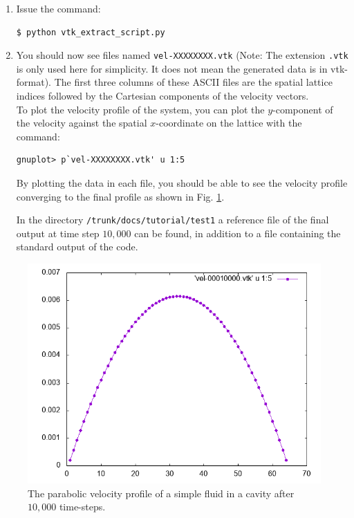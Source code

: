 \documentclass[11pt,twoside,a4paper]{article}
\begin{document}
\begin{enumerate}
\begin{enumerate}
to be processed.
\item \texttt{vel=1} for velocity post-processing, 
\item The other flags should be set to zero, e.g. \texttt{phi=0}. 
\end{enumerate}
\item Issue the command:
\begin{lstlisting}
$ python vtk_extract_script.py
\end{lstlisting}
\item You should now see files named \texttt{vel-XXXXXXXX.vtk} (Note: The extension \texttt{.vtk} is only used here for simplicity.
It does not mean the generated data is in vtk-format). 
The first three columns of these ASCII files are the spatial lattice indices followed by the Cartesian components of the velocity vectors.\\

To plot the velocity profile of the system, you can plot the $y$-component of the velocity against 
the spatial $x$-coordinate on the lattice with the command:
\begin{lstlisting}
gnuplot> p`vel-XXXXXXXX.vtk' u 1:5
\end{lstlisting} 
By plotting the data in each file, you should be able to see the velocity profile converging to the final profile 
as shown in Fig. \ref{fig:velocityProfile}. 

In the directory \texttt{/trunk/docs/tutorial/test1} a reference file of the final 
output at time step $10,000$ can be found, in addition to a file containing the standard output of the code.
\end{enumerate} 

\begin{figure}[h]
\begin{center}
\includegraphics[width=0.6\linewidth]{velProf.png}
  \caption{The parabolic velocity profile of a simple fluid in a cavity after $10,000$ time-steps.}
  \label{fig:velocityProfile}
  \end{center}
\end{figure}
\end{document}
